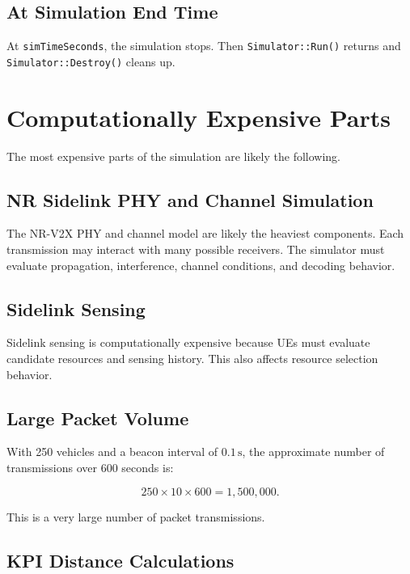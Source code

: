 \documentclass[11pt,a4paper]{article}
\begin{document}
\subsection{At Simulation End Time}

At \texttt{simTimeSeconds}, the simulation stops. Then \texttt{Simulator::Run()} returns and \texttt{Simulator::Destroy()} cleans up.

\section{Computationally Expensive Parts}

The most expensive parts of the simulation are likely the following.

\subsection{NR Sidelink PHY and Channel Simulation}

The NR-V2X PHY and channel model are likely the heaviest components. Each transmission may interact with many possible receivers. The simulator must evaluate propagation, interference, channel conditions, and decoding behavior.

\subsection{Sidelink Sensing}

Sidelink sensing is computationally expensive because UEs must evaluate candidate resources and sensing history. This also affects resource selection behavior.

\subsection{Large Packet Volume}

With 250 vehicles and a beacon interval of \(0.1\,\mathrm{s}\), the approximate number of transmissions over 600 seconds is:

\begin{equation}
250 \times 10 \times 600 = 1{,}500{,}000.
\end{equation}

This is a very large number of packet transmissions.

\subsection{KPI Distance Calculations}
\end{document}

